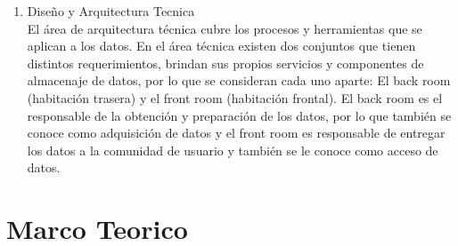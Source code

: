 \documentclass[preprint,12pt]{elsarticle}
\begin{document}
\begin{enumerate}[4.1]
\item Diseño y Arquitectura Tecnica \\

El área de arquitectura técnica cubre los procesos y herramientas que se aplican a los datos. En el área técnica existen dos conjuntos que tienen distintos requerimientos, brindan sus propios servicios y componentes de almacenaje de datos, por lo que se consideran cada uno aparte: El back room (habitación trasera) y el front room (habitación frontal). El back room es el responsable de la obtención y preparación de los datos, por lo que también se conoce como adquisición de datos y el front room es responsable de entregar los datos a la comunidad de usuario y también se le conoce como acceso de datos.\\
\end{enumerate}

\section{Marco Teorico}
 
\end{document}
